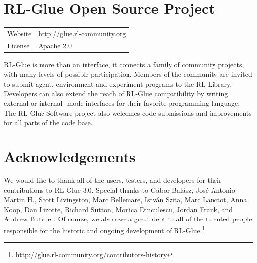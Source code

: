 \documentclass[twoside,11pt]{article}
\begin{document}
 
\section{RL-Glue Open Source Project}
\begin{tabular}{ l l }
  Website &  \url{http://glue.rl-community.org} \\
  License & Apache 2.0  \\
\end{tabular}
\newline
\newline
RL-Glue is more than an interface, it connects a family of community projects, with many levels of possible participation. Members of the community are invited to submit agent, environment and experiment programs to the RL-Library. Developers can also extend the reach of RL-Glue compatibility by writing external or internal -mode interfaces for their favorite programming language.  The RL-Glue Software project also welcomes code submissions and improvements for all parts of the code base.  





\section{Acknowledgements}
We would like to thank all of the users, testers, and developers for their contributions to RL-Glue 3.0. Special thanks to 
G\'{a}bor Bal\'{a}sz,  %
Jos\'{e} Antonio Martin H.,  %
Scott Livingston, %
Marc Bellemare, 
Istv\'{a}n Szita,  %
Marc Lanctot, 
Anna Koop, 
Dan Lizotte,
Richard Sutton,
Monica Dinculescu,
Jordan Frank, and
Andrew Butcher.  Of course, we also owe a great debt to all of the talented people responsible for the historic and ongoing development of RL-Glue.\footnote{\url{http://glue.rl-community.org/contributors-history}}

%
%




\end{document}
